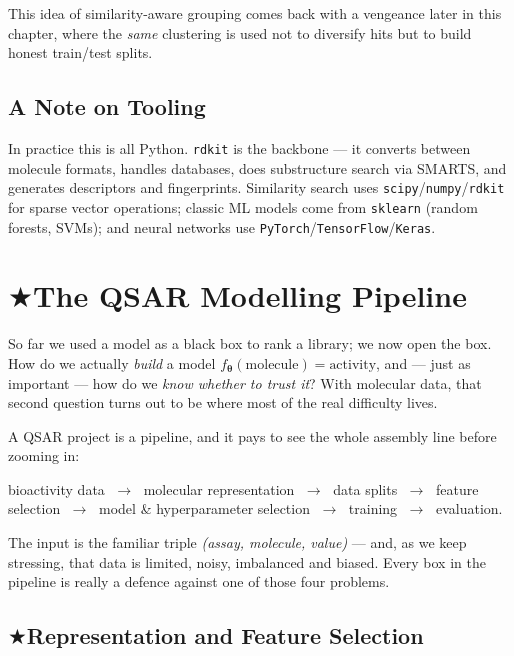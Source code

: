 \documentclass[11pt, oneside]{book}
\makeatletter
\newcommand{\starglyph}{\textcolor{stargold}{\ensuremath{\bigstar}}}
\newcommand{\starsec}[1]{%
  \texorpdfstring{\starglyph\hspace{0.4em}\textcolor{star@frame}{#1}}{#1}}
\newcommand{\params}{\boldsymbol{\theta}}   %
\makeatother
\begin{document}
This idea of similarity-aware grouping comes back with a vengeance later in this
chapter, where the \emph{same} clustering is used not to diversify
hits but to build honest train/test splits.

\subsection{A Note on Tooling}

In practice this is all Python. \texttt{rdkit} is the backbone --- it converts
between molecule formats, handles databases, does substructure search via SMARTS,
and generates descriptors and fingerprints. Similarity search uses
\texttt{scipy}/\texttt{numpy}/\texttt{rdkit} for sparse vector operations; classic
ML models come from \texttt{sklearn} (random forests, SVMs); and neural networks
use \texttt{PyTorch}/\texttt{TensorFlow}/\texttt{Keras}.



\newpage
\section{\starsec{The QSAR Modelling Pipeline}}

So far we used a model as a black box to rank a library; we now open the box. How
do we actually \emph{build} a model
$f_{\params}(\text{molecule}) = \text{activity}$, and --- just as important --- how
do we \emph{know whether to trust it}? With molecular data, that second question
turns out to be where most of the real difficulty lives.

A QSAR project is a pipeline, and it pays to see the whole assembly line before
zooming in:

\begin{center}
bioactivity data $\;\to\;$ molecular representation $\;\to\;$ data splits
$\;\to\;$ feature selection $\;\to\;$ model \& hyperparameter selection
$\;\to\;$ training $\;\to\;$ evaluation.
\end{center}

The input is the familiar triple \emph{(assay, molecule, value)} --- and, as we
keep stressing, that data is limited, noisy, imbalanced and biased. Every box in
the pipeline is really a defence against one of those four problems.

\subsection{\starsec{Representation and Feature Selection}}
\end{document}
